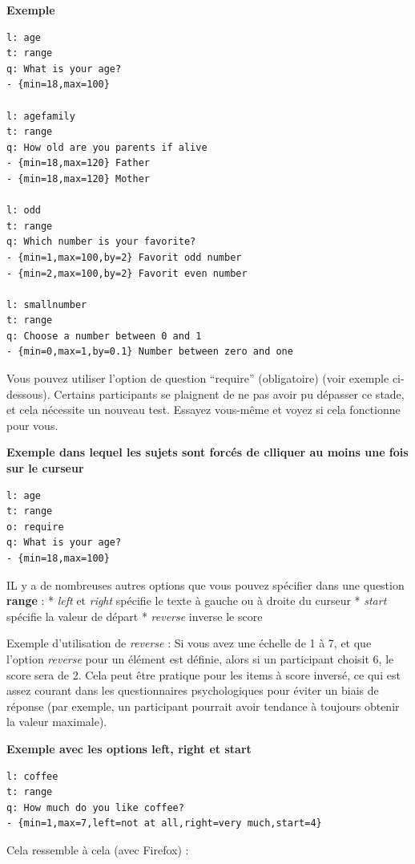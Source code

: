 \documentclass[
]{book}
\begin{document}
\textbf{Exemple}

\begin{verbatim}
l: age
t: range
q: What is your age?
- {min=18,max=100}

l: agefamily
t: range
q: How old are you parents if alive
- {min=18,max=120} Father
- {min=18,max=120} Mother

l: odd
t: range
q: Which number is your favorite?
- {min=1,max=100,by=2} Favorit odd number
- {min=2,max=100,by=2} Favorit even number

l: smallnumber
t: range
q: Choose a number between 0 and 1
- {min=0,max=1,by=0.1} Number between zero and one
\end{verbatim}

Vous pouvez utiliser l'option de question ``require'' (obligatoire) (voir exemple ci-dessous). Certains participants se plaignent de ne pas avoir pu dépasser ce stade, et cela nécessite un nouveau test. Essayez vous-même et voyez si cela fonctionne pour vous.

\textbf{Exemple dans lequel les sujets sont forcés de clliquer au moins une fois sur le curseur}

\begin{verbatim}
l: age
t: range
o: require
q: What is your age?
- {min=18,max=100}
\end{verbatim}

IL y a de nombreuses autres options que vous pouvez spécifier dans une question \textbf{range} :
* \emph{left} et \emph{right} spécifie le texte à gauche ou à droite du curseur
* \emph{start} spécifie la valeur de départ
* \emph{reverse} inverse le score

Exemple d'utilisation de \emph{reverse} : Si vous avez une échelle de 1 à 7, et que l'option \emph{reverse} pour un élément est définie, alors si un participant choisit 6, le score sera de 2. Cela peut être pratique pour les items à score inversé, ce qui est assez courant dans les questionnaires psychologiques pour éviter un biais de réponse (par exemple, un participant pourrait avoir tendance à toujours obtenir la valeur maximale).

\textbf{Exemple avec les options left, right et start}

\begin{verbatim}
l: coffee
t: range
q: How much do you like coffee?
- {min=1,max=7,left=not at all,right=very much,start=4}
\end{verbatim}

Cela ressemble à cela (avec Firefox) :
\end{document}
